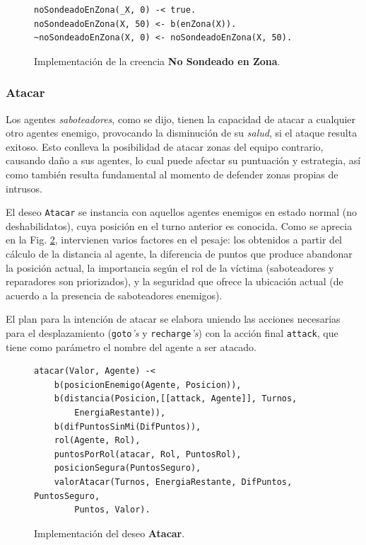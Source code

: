 \documentclass[oneside]{book}
\theoremstyle{definition}
\begin{document}
\begin{figure}
\begin{verbatim}
noSondeadoEnZona(_X, 0) -< true.
noSondeadoEnZona(X, 50) <- b(enZona(X)).
~noSondeadoEnZona(X, 0) <- noSondeadoEnZona(X, 50).
\end{verbatim}
\caption{Implementación de la creencia \textbf{No Sondeado 
en Zona}.}
\label{fig:creenciaNoSondeado}
\end{figure}

\subsubsection{Atacar}

Los agentes \textit{saboteadores}, como se dijo, tienen la capacidad de atacar a cualquier otro 
agentes enemigo, provocando la disminución de su \textit{salud}, si el ataque resulta exitoso.
Esto conlleva la posibilidad de atacar zonas del equipo contrario, causando daño a sus agentes, 
lo cual puede afectar su puntuación y estrategia, así como también resulta fundamental 
al momento de defender zonas propias de intrusos.

El deseo \texttt{Atacar} se instancia con aquellos agentes enemigos en estado normal (no deshabilidatos),
cuya posición en el turno anterior es conocida. Como se aprecia en la Fig. \ref{fig:deseoAtacar}, 
intervienen varios factores en el pesaje: los obtenidos a partir del cálculo de la distancia al 
agente, la diferencia de puntos que produce abandonar la posición actual, la importancia según el 
rol de la víctima (saboteadores y reparadores son priorizados), y la seguridad que ofrece la ubicación
actual (de acuerdo a la presencia de saboteadores enemigos). 

El plan para la intención de atacar se elabora uniendo las acciones necesarias para el desplazamiento
(\texttt{goto}\textit{'s} y \texttt{recharge}\textit{'s}) con la acción final \texttt{attack}, que 
tiene como parámetro el nombre del agente a ser atacado.

\begin{figure}
\begin{verbatim}
atacar(Valor, Agente) -<
    b(posicionEnemigo(Agente, Posicion)),
    b(distancia(Posicion,[[attack, Agente]], Turnos, 
    	EnergiaRestante)),
	b(difPuntosSinMi(DifPuntos)),
    rol(Agente, Rol),
	puntosPorRol(atacar, Rol, PuntosRol),
	posicionSegura(PuntosSeguro),
	valorAtacar(Turnos, EnergiaRestante, DifPuntos, PuntosSeguro, 
		Puntos, Valor).
\end{verbatim}
\caption{Implementación del deseo \textbf{Atacar}.}
\label{fig:deseoAtacar}
\end{figure}
\end{document}
